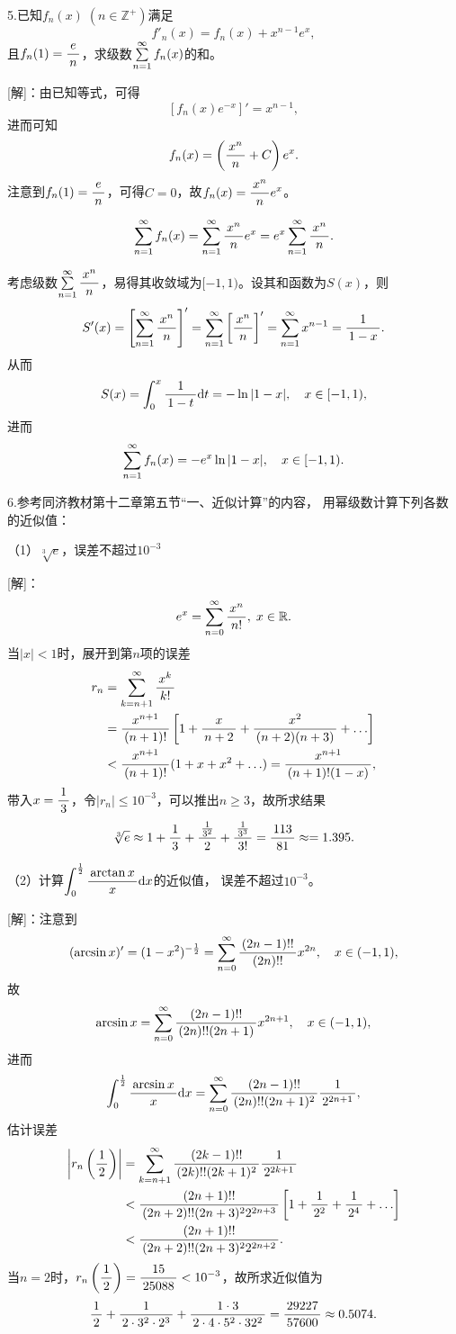 \bs

5.已知$f_n(x)\;(n\in\mathbb{Z}^+)$满足
$$f'_n(x)=f_n(x)+x^{n-1}e^x,$$
且$f_n(1)=\df en$，求级数$\sumn f_n(x)$的和。

[解]：由已知等式，可得
$$\left[f_n(x)e^{-x}\right]'=x^{n-1},$$
进而可知
$$f_n(x)=\left(\df{x^n}n+C\right)e^x.$$
注意到$f_n(1)=\df en$，可得$C=0$，故$f_n(x)=\df{x^n}ne^x$。

$$\sumn f_n(x)=\sumn\df{x^n}ne^x=e^x\sumn\df{x^n}n.$$
	
考虑级数$\sumn\df{x^n}n$，易得其收敛域为$[-1,1)$。设其和函数为$S(x)$，则
$$S'(x)=\left[\sumn\df{x^n}n\right]'
=\sumn\left[\df{x^n}n\right]'=\sumn x^{n-1}=\df1{1-x}.$$
从而
$$S(x)=\dint_0^x\df1{1-t}\d t=-\ln|1-x|,\quad x\in[-1,1),$$
进而
$$\sumn f_n(x)=-e^x\ln|1-x|,\quad x\in[-1,1).$$
\fin

\bs

6.参考{\kaishu 同济教材第十二章第五节“一、近似计算”}的内容，
用幂级数计算下列各数的近似值：

（1）$\sqrt[3]e$，误差不超过$10^{-3}$

[解]：
$$e^x=\sumn[0]\df{x^n}{n!},\;x\in\mbb{R}.$$
当$|x|<1$时，展开到第$n$项的误差
\begin{align*}
	r_n&=\sum\limits_{k=n+1}^{\infty}\df{x^k}{k!}\\
	&=\df{x^{n+1}}{(n+1)!}\left[1+\df{x}{n+2}+\df{x^2}{(n+2)(n+3)}+\ldots\right]\\
	&<\df{x^{n+1}}{(n+1)!}(1+x+x^2+\ldots)=\df{x^{n+1}}{(n+1)!(1-x)},
\end{align*}
带入$x=\df13$，令$|r_n|\leq 10^{-3}$，可以推出$n\geq 3$，故所求结果
$$
\sqrt[3]e\approx1+\df13+\df{\frac1{3^2}}2+\df{\frac1{3^3}}{3!}
=\df{113}{81}\approx=1.395.
$$

（2）计算$\dint_0^{\frac12}\df{\arctan x}x\d x$的近似值，
误差不超过$10^{-3}$。

[解]：注意到
$$(\arcsin x)'=(1-x^2)^{-\frac12}
=\sumn[0]\df{(2n-1)!!}{(2n)!!}x^{2n},\quad x\in(-1,1),$$
故
$$\arcsin x=\sumn[0]\df{(2n-1)!!}{(2n)!!(2n+1)}x^{2n+1},\quad x\in(-1,1),$$
进而
$$\dint_0^{\frac12}\df{\arcsin x}x\d x
=\sumn[0]\df{(2n-1)!!}{(2n)!!(2n+1)^2}\df1{2^{2n+1}},$$
估计误差
\begin{align*}
	\left|r_n\left(\df12\right)\right|
	&=\sum\limits_{k=n+1}^{\infty}\df{(2k-1)!!}
	{(2k)!!(2k+1)^2}\df1{2^{2k+1}}\\
	&<\df{(2n+1)!!}{(2n+2)!!(2n+3)^22^{2n+3}}
	\left[1+\df1{2^2}+\df1{2^4}+\ldots\right]\\
	&<\df{(2n+1)!!}{(2n+2)!!(2n+3)^22^{2n+2}}.
\end{align*}
当$n=2$时，$r_n\left(\df12\right)=\df{15}{25088}<10^{-3}$，故所求近似值为
$$\df12+\df1{2\cdot3^2\cdot2^3}+\df{1\cdot3}{2\cdot4\cdot5^2\cdot32^2}
=\df{29227}{57600}\approx0.5074.$$
\fin 

